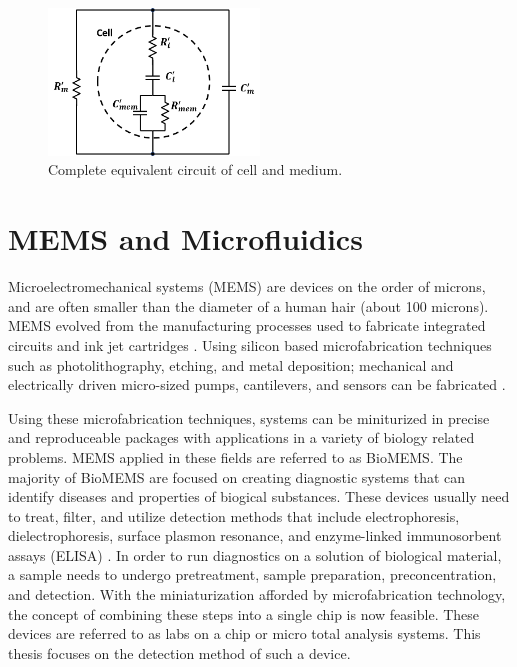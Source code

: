  \begin{figure}
     \centering
     \includegraphics[width=0.5\textwidth]{images/completeCellMediumCircuit.png}
     \caption{Complete equivalent circuit of cell and medium.}
     \label{fig:complete_equiv_circuit_cell_medium}
 \end{figure}
 
 \section[MEMs and Microfluidics]{MEMS and Microfluidics}
 
 \par Microelectromechanical systems (MEMS) are devices on the order of microns, and are often smaller than the diameter of a human hair (about 100 microns). MEMS evolved from the manufacturing processes used to fabricate integrated circuits and ink jet cartridges \cite{xia_soft_1998-1}. Using silicon based microfabrication techniques such as photolithography, etching, and metal deposition; mechanical and electrically driven micro-sized pumps, cantilevers, and sensors can be fabricated \cite{wang_bio-mems:_2006}. 
 
 \par Using these microfabrication techniques, systems can be miniturized in precise and reproduceable packages with applications in a variety of biology related problems. MEMS applied in these fields are referred to as BioMEMS. The majority of BioMEMS are focused on creating diagnostic systems that can identify diseases and properties of biogical substances. These devices usually need to treat, filter, and utilize detection methods that include electrophoresis, dielectrophoresis, surface plasmon resonance, and enzyme-linked immunosorbent assays (ELISA) \cite{foudeh_microfluidic_2012}. In order to run diagnostics on a solution of biological material, a sample needs to undergo pretreatment, sample preparation, preconcentration, and detection. With the miniaturization afforded by microfabrication technology, the concept of combining these steps into a single chip is now feasible. These devices are referred to as labs on a chip or micro total analysis systems. This thesis focuses on the detection method of such a device.
 
